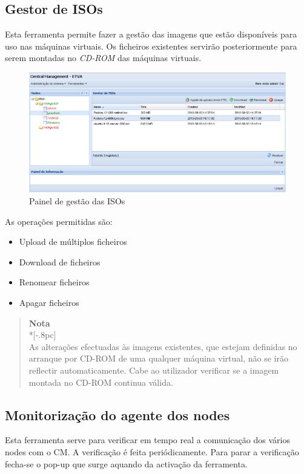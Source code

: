 \subsection{Gestor de ISOs}
\label{sec:iso_manager}
Esta ferramenta permite fazer a gestão das imagens que estão disponíveis para uso nas máquinas virtuais.
Os ficheiros existentes servirão posteriormente para serem montadas no \emph{CD-ROM} das máquinas virtuais.

\begin{figure}[H]
	\begin{center}
	\includegraphics[scale=0.5]{screenshots/iso_manager.png}
	\caption{Painel de gestão das ISOs}
	\label{fig:iso_manager}
	\end{center}
\end{figure}

As operações permitidas são:
\begin{itemize}
\item Upload de múltiplos ficheiros
\item Download de ficheiros
\item Renomear ficheiros
\item Apagar ficheiros
\end{itemize}


\begin{quote}
	{\large \bf Nota} \\*[-.8pc]
	\underline{\hspace{6in}} \\
	As alterações efectuadas às imagens existentes, que estejam definidas no arranque por CD-ROM de uma qualquer máquina virtual,
     não se irão reflectir automaticamente. Cabe ao utilizador verificar se a imagem montada no CD-ROM continua válida.
\end{quote}

\subsection{Monitorização do agente dos nodes}
Esta ferramenta serve para verificar em tempo real a comunicação dos vários nodes com o CM. A verificação é feita periódicamente.
Para parar a verificação fecha-se o pop-up que surge aquando da activação da ferramenta.

